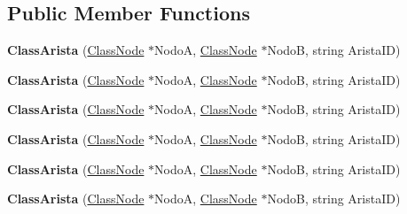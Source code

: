 \subsection*{Public Member Functions}
\begin{DoxyCompactItemize}
\item 
\mbox{\label{class_class_arista_ac0fc70beb470285da7bcdfd97848aef1}} 
{\bfseries Class\+Arista} (\hyperlink{class_class_node}{Class\+Node} $\ast$NodoA, \hyperlink{class_class_node}{Class\+Node} $\ast$NodoB, string Arista\+ID)
\item 
\mbox{\label{class_class_arista_ac0fc70beb470285da7bcdfd97848aef1}} 
{\bfseries Class\+Arista} (\hyperlink{class_class_node}{Class\+Node} $\ast$NodoA, \hyperlink{class_class_node}{Class\+Node} $\ast$NodoB, string Arista\+ID)
\item 
\mbox{\label{class_class_arista_ac0fc70beb470285da7bcdfd97848aef1}} 
{\bfseries Class\+Arista} (\hyperlink{class_class_node}{Class\+Node} $\ast$NodoA, \hyperlink{class_class_node}{Class\+Node} $\ast$NodoB, string Arista\+ID)
\item 
\mbox{\label{class_class_arista_ac0fc70beb470285da7bcdfd97848aef1}} 
{\bfseries Class\+Arista} (\hyperlink{class_class_node}{Class\+Node} $\ast$NodoA, \hyperlink{class_class_node}{Class\+Node} $\ast$NodoB, string Arista\+ID)
\item 
\mbox{\label{class_class_arista_ac0fc70beb470285da7bcdfd97848aef1}} 
{\bfseries Class\+Arista} (\hyperlink{class_class_node}{Class\+Node} $\ast$NodoA, \hyperlink{class_class_node}{Class\+Node} $\ast$NodoB, string Arista\+ID)
\item 
\mbox{\label{class_class_arista_ac0fc70beb470285da7bcdfd97848aef1}} 
{\bfseries Class\+Arista} (\hyperlink{class_class_node}{Class\+Node} $\ast$NodoA, \hyperlink{class_class_node}{Class\+Node} $\ast$NodoB, string Arista\+ID)
\end{DoxyCompactItemize}
